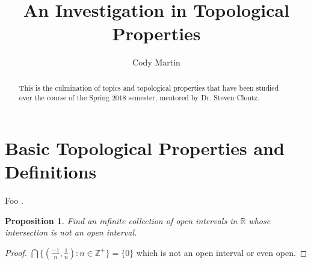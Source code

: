 \documentclass{amsart}
\theoremstyle{plain}
\newtheorem{proposition}[theorem]{Proposition}
\theoremstyle{definition}
\theoremstyle{remark}
\begin{document}
\title{An Investigation in Topological Properties}


\author{Cody Martin}
\address{1313 Schillinger Rd. S. 
Apt. 3407
Mobile, AL 36695}









\begin{abstract}
  This is the culmination of topics and topological properties that have been studied over the course of the Spring 2018 semester, mentored by Dr. Steven Clontz.
\end{abstract}


\maketitle

\section{Basic Topological Properties and Definitions}

Foo \cite{Clontz2015} \cite{Clontz2010}.

	\begin{proposition}
	Find an infinite collection of open intervals in $\mathbb{R}$ whose intersection is not an open interval.
	\end{proposition}
	\begin{proof}
	$\bigcap\lbrace (\frac{-1}{n}, \frac{1}{n}) : n \in \mathbb{Z}^+\rbrace = \lbrace 0 \rbrace$ which is not an open interval or even open.
	\end{proof}
\end{document}
